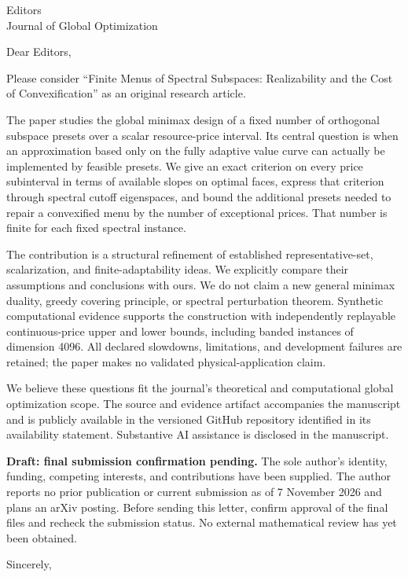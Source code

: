 \documentclass[11pt]{letter}
\date{7 November 2026}
\begin{document}
\begin{letter}{Editors\\Journal of Global Optimization}
\opening{Dear Editors,}
Please consider ``Finite Menus of Spectral Subspaces: Realizability and the
Cost of Convexification'' as an original research article.

The paper studies the global minimax design of a fixed number of orthogonal
subspace presets over a scalar resource-price interval. Its central question
is when an approximation based only on the fully adaptive value curve can
actually be implemented by feasible presets. We give an exact criterion on
every price subinterval in terms of available slopes on optimal faces,
express that criterion through spectral cutoff eigenspaces, and bound the
additional presets needed to repair a convexified menu by the number of
exceptional prices. That number is finite for each fixed spectral instance.

The contribution is a structural refinement of established representative-set,
scalarization, and finite-adaptability ideas. We explicitly compare their
assumptions and conclusions with ours. We do not claim a new general
minimax duality, greedy covering principle, or spectral perturbation theorem.
Synthetic computational evidence supports the construction with independently
replayable continuous-price upper and lower bounds, including banded instances
of dimension 4096. All declared slowdowns, limitations, and development
failures are retained; the paper makes no validated physical-application claim.

We believe these questions fit the journal's theoretical and computational
global optimization scope. The source and evidence artifact accompanies the
manuscript and is publicly available in the versioned GitHub repository
identified in its availability statement. Substantive AI assistance is
disclosed in the manuscript.

\textbf{Draft: final submission confirmation pending.} The sole author's
identity, funding, competing interests, and contributions have been supplied.
The author reports no prior publication or current submission as of
7 November 2026 and plans an arXiv posting. Before sending this letter,
confirm approval of the final files and recheck the submission status.
No external mathematical review has yet been obtained.
\closing{Sincerely,}
\end{letter}
\end{document}
